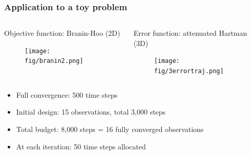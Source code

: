 \documentclass[10pt]{beamer}
\begin{document}
\frame
{
\frametitle{Application to a toy problem}
\begin{columns}
\begin{column}{5cm}
\centering
Objective function: Branin-Hoo (2D)
\begin{figure}[h!]
	\centering
	\texttt{[image: fig/branin2.png]}
  \end{figure}
\end{column}

\begin{column}{5cm}
\centering
Error function: attenuated Hartman (3D)
  \begin{figure}[h!]
	\centering
	\texttt{[image: fig/3errortraj.png]}
  \end{figure}
  \end{column}
\end{columns}
\begin{itemize}
 \item Full convergence: 500 time steps
 \item Initial design: 15 observations, total 3,000 steps
 \item Total budget: 8,000 steps = 16 fully converged observations
 \item At each iteration: 50 time steps allocated
\end{itemize}
}
\end{document}
